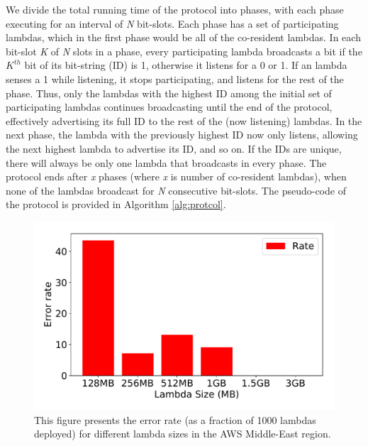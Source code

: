 We divide the total running time of the protocol into phases, with each phase executing for an
interval of \textit{N} bit-slots. Each phase has a set of participating
lambdas, which in the first phase would be all of the co-resident lambdas. In
each bit-slot \textit{K} of \textit{N} slots in a phase, every participating
lambda broadcasts a bit if the $K^{th}$ bit of its bit-string (ID) is 1,
otherwise it listens for a 0 or 1. If an lambda senses a 1 while listening, it
stops participating, and listens for the rest of the phase. Thus, only the
lambdas with the highest ID among the initial set of participating lambdas
continues broadcasting until the end of the protocol, effectively advertising
its full ID to the rest of the (now listening) lambdas. In the next phase, the
lambda with the previously highest ID now only listens, allowing the next
highest lambda to advertise its ID, and so on.  If the IDs are unique,
there will always be only one lambda that broadcasts in every phase. The
protocol ends after \textit{x} phases (where \textit{x} is number of co-resident
lambdas), when none of the lambdas broadcast for \textit{N} consecutive
bit-slots. The pseudo-code of the protocol is provided in Algorithm
\ref{alg:protcol}. 

\begin{figure}[!t]
  \includegraphics[width=.99\linewidth]{fig/errorrates.pdf}
  \caption{This figure presents the error rate (as a fraction of 1000 lambdas
  deployed) for different lambda sizes in the AWS Middle-East region. 
\label{fig:errorrates}}
\end{figure}

